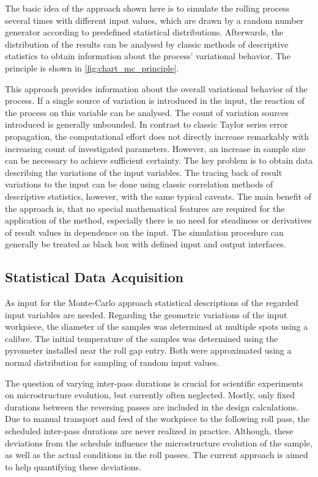 The basic idea of the approach shown here is to simulate the rolling process several times with different input values, which are drawn by a random number generator according to predefined statistical distributions.
Afterwards, the distribution of the results can be analysed by classic methods of descriptive statistics to obtain information about the process' variational behavior.
The principle is shown in \autoref{fig:chart_mc_principle}.

This approach provides information about the overall variational behavior of the process.
If a single source of variation is introduced in the input, the reaction of the process on this variable can be analysed.
The count of variation sources introduced is generally unbounded.
In contrast to classic Taylor series error propagation, the computational effort does not directly increase remarkably with increasing count of investigated parameters.
However, an increase in sample size can be necessary to achieve sufficient certainty.
The key problem is to obtain data describing the variations of the input variables.
The tracing back of result variations to the input can be done using classic correlation methods of descriptive statistics, however, with the same typical caveats.
The main benefit of the approach is, that no special mathematical features are required for the application of the method, especially there is no need for steadiness or derivatives of result values in dependence on the input.
The simulation procedure can generally be treated as black box with defined input and output interfaces.

\subsection{Statistical Data Acquisition}\label{subsec:data-acquisition}

As input for the Monte-Carlo approach statistical descriptions of the regarded input variables are needed.
Regarding the geometric variations of the input workpiece, the diameter of the samples was determined at multiple spots using a calibre.
The initial temperature of the samples was determined using the pyrometer installed near the roll gap entry.
Both were approximated using a normal distribution for sampling of random input values.

The question of varying inter-pass durations is crucial for scientific experiments on microstructure evolution, but currently often neglected.
Mostly, only fixed durations between the reversing passes are included in the design calculations.
Due to manual transport and feed of the workpiece to the following roll pass, the scheduled inter-pass durations are never realized in practice.
Although, these deviations from the schedule influence the microstructure evolution of the sample, as well as the actual conditions in the roll passes.
The current approach is aimed to help quantifying these deviations.

